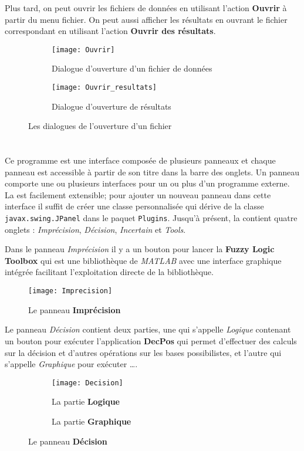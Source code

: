 Plus tard, on peut ouvrir les fichiers de données en utilisant l'action \textbf{Ouvrir} à partir du menu fichier. On
peut aussi afficher les résultats en ouvrant le fichier correspondant en utilisant l'action \textbf{Ouvrir des résultats}.

\begin{figure}[H]
\begin{subfigure}{0.49\textwidth}
\texttt{[image: Ouvrir]}
\caption{Dialogue d'ouverture d'un fichier de données}
\end{subfigure}
\hfill
\begin{subfigure}{0.49\textwidth}
\texttt{[image: Ouvrir\_resultats]}
\caption{Dialogue d'ouverture de résultats}
\end{subfigure}
\caption{Les dialogues de l'ouverture d'un fichier}
\end{figure}

\section{\platformeName}

Ce programme est une interface composée de plusieurs panneaux et chaque panneau est accessible
à partir de son titre dans la barre des onglets. Un panneau comporte une ou plusieurs interfaces pour
un ou plus d'un programme externe.  La \platformename est facilement extensible; pour ajouter un nouveau
panneau dans cette interface il suffit de créer une classe personnalisée qui dérive de la classe
\mbox{\texttt{javax.swing.JPanel}} dans le paquet \texttt{Plugins}. Jusqu'à présent, la \platformename
contient quatre onglets : \textit{Imprécision}, \textit{Décision}, \textit{Incertain}
et \textit{Tools}.

Dans le panneau \textit{Imprécision} il y a un bouton pour lancer la \textbf{Fuzzy Logic Toolbox} qui est une
bibliothèque de \textit{MATLAB} avec une interface graphique intégrée facilitant l'exploitation directe
de la bibliothèque.

\begin{figure}[H]
\centering
\texttt{[image: Imprecision]}
\caption{Le panneau \textbf{Imprécision}}
\end{figure}

Le panneau \textit{Décision} contient deux parties, une qui s'appelle \textit{Logique}
contenant un bouton pour exécuter l'application \textbf{DecPos} qui permet d'effectuer des calculs sur la
décision et d'autres opérations sur les bases possibilistes, et l'autre qui s'appelle \textit{Graphique} pour
exécuter \ldots.
\newsavebox{\screenshot}
\begin{figure}[H]
\begin{subfigure}{0.49\textwidth}
\texttt{[image: Decision]}
\caption{La partie \textbf{Logique}}
\end{subfigure}
\hfill
\begin{subfigure}{0.49\textwidth}
\fbox{\parbox[t][5cm][t]{\textwidth}{\hfill}}
\caption{La partie \textbf{Graphique}}
\end{subfigure}
\caption{Le panneau \textbf{Décision}}
\end{figure}

